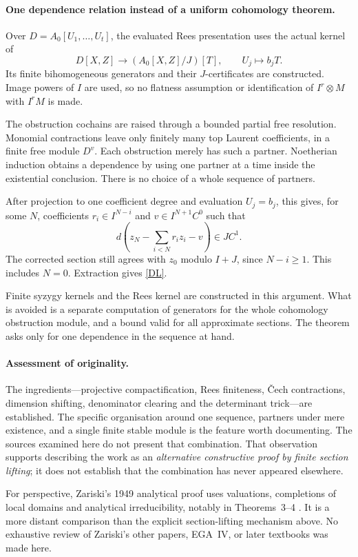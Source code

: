 \documentclass[11pt]{amsart}
\begin{document}
\paragraph{One dependence relation instead of a uniform cohomology theorem.}
Over $D=A_0[U_1,\ldots,U_t]$, the evaluated Rees presentation uses
the actual kernel of
\[
 D[X,Z]\longrightarrow (A_0[X,Z]/J)[T],\qquad U_j\longmapsto b_jT.
\]
Its finite bihomogeneous generators and their $J$-certificates are
constructed. Image powers of $I$ are used, so no flatness assumption
or identification of $I^r\otimes M$ with $I^rM$ is made.

The obstruction cochains are raised through a bounded partial free
resolution. Monomial contractions leave only finitely many top
Laurent coefficients, in a finite free module $D^v$. Each obstruction
merely has such a partner. Noetherian induction obtains a dependence
by using one partner at a time inside the existential conclusion.
There is no choice of a whole sequence of partners.

After projection to one coefficient degree and evaluation $U_j=b_j$,
this gives, for some $N$, coefficients $r_i\in I^{N-i}$ and
$v\in I^{N+1}C^0$ such that
\[
 d\left(z_N-\sum_{i<N}r_i z_i-v\right)\in JC^1.
\]
The corrected section still agrees with $z_0$ modulo $I+J$, since
$N-i\ge1$. This includes $N=0$. Extraction gives \eqref{DL}.

Finite syzygy kernels and the Rees kernel are constructed in this
argument. What is avoided is a separate computation of generators
for the whole cohomology obstruction module, and a bound valid for
all approximate sections. The theorem asks only for one dependence
in the sequence at hand.

\paragraph{Assessment of originality.}
The ingredients---projective compactification, Rees finiteness,
\v Cech contractions, dimension shifting, denominator clearing and
the determinant trick---are established. The specific organisation
around one sequence, partners under mere existence, and a single
finite stable module is the feature worth documenting. The sources
examined here do not present that combination. That observation
supports describing the work as an \emph{alternative constructive
proof by finite section lifting}; it does not establish that the
combination has never appeared elsewhere.

For perspective, Zariski's 1949 analytical proof uses valuations,
completions of local domains and analytical irreducibility, notably
in Theorems~3--4 \cite{Zariski}. It is a more distant comparison than
the explicit section-lifting mechanism above. No exhaustive review
of Zariski's other papers, EGA~IV, or later textbooks was made here.
\end{document}
